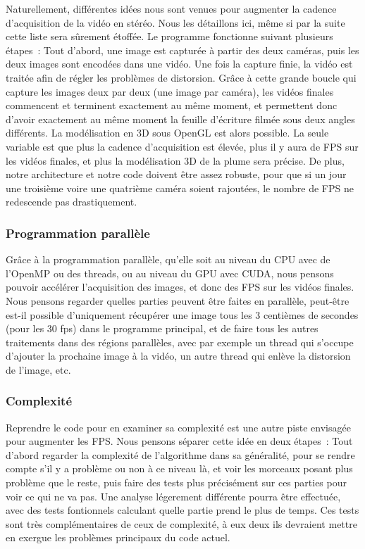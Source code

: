 Naturellement, différentes idées nous sont venues pour augmenter la cadence d'acquisition de la vidéo en stéréo. Nous les détaillons ici, même si par la suite cette liste sera sûrement étoffée. Le programme fonctionne suivant plusieurs étapes~: Tout d'abord, une image est capturée à partir des deux caméras, puis les deux images sont encodées dans une vidéo. Une fois la capture finie, la vidéo est traitée afin de régler les problèmes de distorsion. Grâce à cette grande boucle qui capture les images deux par deux (une image par caméra), les vidéos finales commencent et terminent exactement au même moment, et permettent donc d'avoir exactement au même moment la feuille d'écriture filmée sous deux angles différents. La modélisation en 3D sous OpenGL est alors possible. La seule variable est que plus la cadence d'acquisition est élevée, plus il y aura de FPS sur les vidéos finales, et plus la modélisation 3D de la plume sera précise. De plus, notre architecture et notre code doivent être assez robuste, pour que si un jour une troisième voire une quatrième caméra soient rajoutées, le nombre de FPS ne redescende pas drastiquement.

\subsubsection{Programmation parallèle}

Grâce à la programmation parallèle, qu'elle soit au niveau du CPU avec de l'OpenMP ou des threads, ou au niveau du GPU avec CUDA, nous pensons pouvoir accélérer l'acquisition des images, et donc des FPS sur les vidéos finales. Nous pensons regarder quelles parties peuvent être faites en parallèle, peut-être est-il possible d'uniquement récupérer une image tous les 3 centièmes de secondes (pour les 30 fps) dans le programme principal, et de faire tous les autres traitements dans des régions parallèles, avec par exemple un thread qui s'occupe d'ajouter la prochaine image à la vidéo, un autre thread qui enlève la distorsion de l'image, etc.

\subsubsection{Complexité}

Reprendre le code pour en examiner sa complexité est une autre piste envisagée pour augmenter les FPS. Nous pensons séparer cette idée en deux étapes~: Tout d'abord regarder la complexité de l'algorithme dans sa généralité, pour se rendre compte s'il y a problème ou non à ce niveau là, et voir les morceaux posant plus problème que le reste, puis faire des tests plus précisément sur ces parties pour voir ce qui ne va pas. Une analyse légerement différente pourra être effectuée, avec des tests fontionnels calculant quelle partie prend le plus de temps. Ces tests sont très complémentaires de ceux de complexité, à eux deux ils devraient mettre en exergue les problèmes principaux du code actuel.

